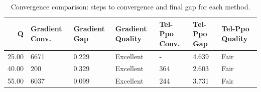 \begin{table}[htbp]
\centering
\caption{Convergence comparison: steps to convergence and final gap for each method.}
\label{tab:convergence_comparison}
\begin{tabular}{rllllll}
\toprule
Q & Gradient Conv. & Gradient Gap & Gradient Quality & Tel-Ppo Conv. & Tel-Ppo Gap & Tel-Ppo Quality \\
\midrule
25.00 & 6671 & 0.229 & Excellent & - & 4.639 & Fair \\
40.00 & 200 & 0.329 & Excellent & 364 & 2.603 & Fair \\
55.00 & 6037 & 0.099 & Excellent & 244 & 3.731 & Fair \\
\bottomrule
\end{tabular}

\end{table}
